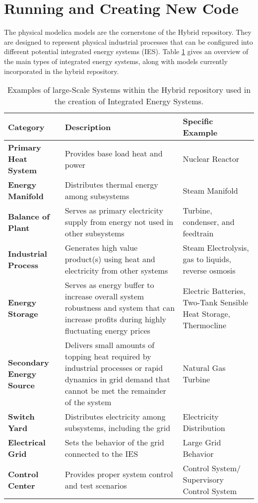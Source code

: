 \section{Running and Creating New Code}
The physical modelica models are the cornerstone of the Hybrid repository. They are designed to represent physical industrial processes that can be configured into different potential integrated energy systems (IES).
Table \ref{tab:table1} gives an overview of the main types of integrated energy systems, along with models currently incorporated in the hybrid repository.


\begin{table}
\begin{center}
\caption{Examples of large-Scale Systems within the Hybrid repository used in the creation of Integrated Energy Systems.}
\label{tab:table1} 
\begin{tabularx}{\columnwidth}{l|X|X} %
      \textbf{Category} & \textbf{Description} & \textbf{Specific Example}\\
      \hline
      \textbf{Primary Heat System} & Provides base load heat and power & Nuclear Reactor\\
      \textbf{Energy Manifold} & Distributes thermal energy among subsystems & Steam Manifold\\
      \textbf{Balance of Plant} & Serves as primary electricity supply from energy not used in other subsystems & Turbine, condenser, and feedtrain\\
      \textbf{Industrial Process} & Generates high value product(s) using heat and electricity from other systems & Steam Electrolysis, gas to liquids, reverse osmosis\\
      \textbf{Energy Storage} & Serves as energy buffer to increase overall system robustness and system that can increase profits during highly fluctuating energy prices & Electric Batteries, Two-Tank Sensible Heat Storage, Thermocline \\
      \textbf{Secondary Energy Source} & Delivers small amounts of topping heat required by industrial processes or rapid dynamics in grid demand that cannot be met the remainder of the system & Natural Gas Turbine\\
      \textbf{Switch Yard} & Distributes electricity among subsystems, including the grid & Electricity Distribution \\
      \textbf{Electrical Grid} & Sets the behavior of the grid connected to the IES & Large Grid Behavior\\
      \textbf{Control Center} & Provides proper system control and test scenarios  & Control System/ Supervisory Control System\\
\end{tabularx}
\end{center}

\end{table}




